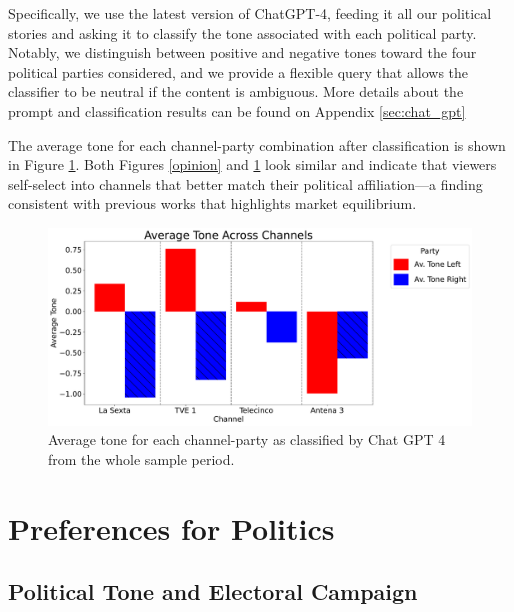 \documentclass[12pt]{article}
\begin{document}
Specifically, we use the latest version of ChatGPT-4, feeding it all our political stories and asking it to classify the tone associated with each political party. Notably, we distinguish between positive and negative tones toward the four political parties considered, and we provide a flexible query that allows the classifier to be neutral if the content is ambiguous. More details about the prompt and classification results can be found on Appendix \ref{sec:chat_gpt}

The average tone for each channel-party combination after classification is shown in Figure \ref{fig:chat}. Both Figures \ref{opinion} and \ref{fig:chat} look similar and indicate that viewers self-select into channels that better match their political affiliation—a finding consistent with previous works \citep{gentzkow2011competition} that highlights market equilibrium.




\begin{figure}[h!]
	\centering
		\includegraphics[width=120mm]{figures/chatgpt}
	\caption{Average tone for each channel-party as classified by Chat GPT 4 from the whole sample period. }
	\label{fig:chat}
\end{figure}









 
 


\section{Preferences for Politics}\label{section:politics}

\subsection{Political Tone and Electoral Campaign}
\end{document}
